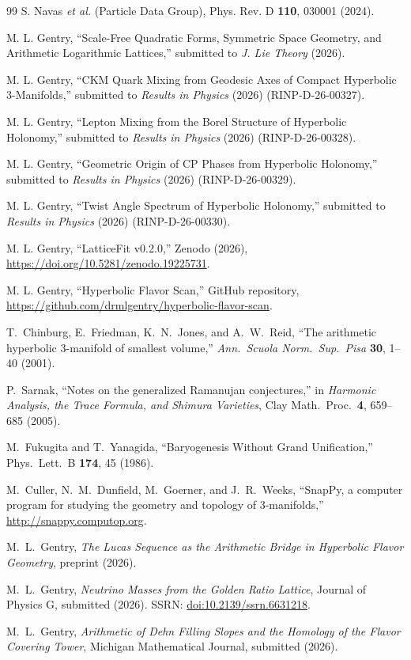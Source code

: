 ﻿\documentclass[12pt]{article}
\theoremstyle{definition}
\begin{document}
\begin{thebibliography}{99}
  S. Navas \textit{et al.} (Particle Data Group),
  Phys. Rev. D \textbf{110}, 030001 (2024).

  M. L. Gentry,
  ``Scale-Free Quadratic Forms, Symmetric Space Geometry, and Arithmetic Logarithmic Lattices,''
  submitted to \textit{J. Lie Theory} (2026).

  M. L. Gentry,
  ``CKM Quark Mixing from Geodesic Axes of Compact Hyperbolic 3-Manifolds,''
  submitted to \textit{Results in Physics} (2026) (RINP-D-26-00327).

  M. L. Gentry,
  ``Lepton Mixing from the Borel Structure of Hyperbolic Holonomy,''
  submitted to \textit{Results in Physics} (2026) (RINP-D-26-00328).

  M. L. Gentry,
  ``Geometric Origin of CP Phases from Hyperbolic Holonomy,''
  submitted to \textit{Results in Physics} (2026) (RINP-D-26-00329).

  M. L. Gentry,
  ``Twist Angle Spectrum of Hyperbolic Holonomy,''
  submitted to \textit{Results in Physics} (2026) (RINP-D-26-00330).

  M. L. Gentry,
  ``LatticeFit v0.2.0,''
  Zenodo (2026), \url{https://doi.org/10.5281/zenodo.19225731}.

  M. L. Gentry,
  ``Hyperbolic Flavor Scan,''
  GitHub repository, \url{https://github.com/drmlgentry/hyperbolic-flavor-scan}.

  T.~Chinburg, E.~Friedman, K.~N.~Jones, and A.~W.~Reid,
  ``The arithmetic hyperbolic 3-manifold of smallest volume,''
  \emph{Ann.\ Scuola Norm.\ Sup.\ Pisa} \textbf{30}, 1--40 (2001).

  P.~Sarnak,
  ``Notes on the generalized Ramanujan conjectures,''
  in \emph{Harmonic Analysis, the Trace Formula, and Shimura Varieties},
  Clay Math.\ Proc.\ \textbf{4}, 659--685 (2005).

  M.~Fukugita and T.~Yanagida,
  ``Baryogenesis Without Grand Unification,''
  Phys.\ Lett.\ B \textbf{174}, 45 (1986).

  M.~Culler, N.~M.~Dunfield, M.~Goerner, and J.~R.~Weeks,
  ``SnapPy, a computer program for studying the geometry and topology of 3-manifolds,''
  \url{http://snappy.computop.org}.
\end{thebibliography}

M.~L.~Gentry,
\textit{The Lucas Sequence as the Arithmetic Bridge in Hyperbolic Flavor Geometry},
preprint (2026).

M.~L.~Gentry,
\textit{Neutrino Masses from the Golden Ratio Lattice},
Journal of Physics G, submitted (2026). SSRN: \href{https://doi.org/10.2139/ssrn.6631218}{doi:10.2139/ssrn.6631218}.

M.~L.~Gentry,
\textit{Arithmetic of Dehn Filling Slopes and the Homology of the Flavor Covering Tower},
Michigan Mathematical Journal, submitted (2026).
\end{document}
